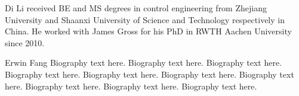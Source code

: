 \documentclass[10pt,journal,compsoc]{IEEEtran}
\theoremstyle{mytheoremstyle}
\theoremstyle{mytheoremstyle}
\theoremstyle{mytheoremstyle}
\begin{document}
\ifCLASSOPTIONcaptionsoff
  \newpage
\fi





%
%
%


% 

\begin{IEEEbiographynophoto}{Di Li}
received BE and MS degrees in control engineering from Zhejiang University and Shaanxi University of Science and Technology respectively in China.
He worked with James Gross for his PhD in RWTH Aachen University since 2010.
\end{IEEEbiographynophoto}

\begin{IEEEbiography}{Erwin Fang}
Biography text here.
Biography text here.
Biography text here.
Biography text here.
Biography text here.
Biography text here.
Biography text here.
Biography text here.
Biography text here.
Biography text here.
\end{IEEEbiography}
\end{document}
